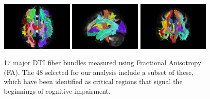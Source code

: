 \begin{figure}
\centering
  \includegraphics[width=0.32\textwidth]{3_covtraj/figs/majorDTI_FA/screenshot0001.png}
  \includegraphics[width=0.32\textwidth]{3_covtraj/figs/majorDTI_FA/screenshot0002.png}
  \includegraphics[width=0.32\textwidth]{3_covtraj/figs/majorDTI_FA/screenshot0003.png}
  \caption{\label{fig:majorDTI}17 major DTI fiber bundles measured using Fractional Anisotropy (FA). The 48 selected for our analysis include a subset of these, which have been identified as critical regions that signal the beginnings of cognitive impairment.}
\end{figure}

\newpage


